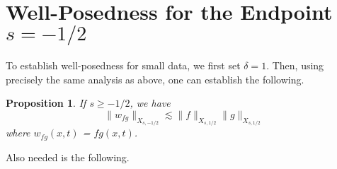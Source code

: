 \documentclass[12pt,reqno]{amsart}
\numberwithin{equation}{section}  %
\newtheorem{proposition}[theorem]{Proposition}
\begin{document}
\section{Well-Posedness for the Endpoint $s = -1/2$} 
\label{sec:}
To establish well-posedness for small data, we first set $\delta =1$. Then, using precisely the same analysis as above, one can establish the following.
%
%
\begin{proposition}
\label{prop:bilinear-est-end}
	If $s \ge -1/2$, we have
	\begin{equation}
	  \| w_{fg} \|_{X_{s,-1/2}}
		    \lesssim \|f\|_{X_{s,1/2}} \|g\|_{X_{s,1/2}}
	\end{equation}
  where $w_{fg}(x,t)$ = $fg (x,t)$.
  \end{proposition}
%
%
Also needed is the following.
\end{document}
